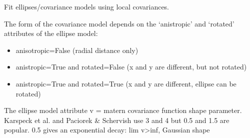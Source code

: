 \documentclass[letterpaper,10pt,english]{sphinxmanual}
\begin{document}
\begin{fulllineitems}
\begin{fulllineitems}
\label{\detokenize{ellipse:glomar_gridding.ellipse.EllipseBuilder.fit_ellipse_model}}
\pysigstartsignatures
\pysiglinewithargsret
{}
{\sphinxparamcomma {}\sphinxparamcomma {}\sphinxparamcomma {}\sphinxparamcomma {}\sphinxparamcomma {}\sphinxparamcomma {}\sphinxparamcomma {}\sphinxparamcomma {}\sphinxparamcomma {}\sphinxparamcomma {}\sphinxparamcomma {}\sphinxparamcomma {}\sphinxparamcomma {}}
{}
\pysigstopsignatures
\sphinxAtStartPar
Fit ellipses/covariance models using local covariances.

\sphinxAtStartPar
The form of the covariance model depends on the ‘anistropic’ and
‘rotated’ attributes of the ellipse model:
\begin{itemize}
\item {}
\sphinxAtStartPar
anisotropic=False (radial distance only)

\item {}
\sphinxAtStartPar
anistropic=True and rotated=False (x and y are different, but not
rotated)

\item {}
\sphinxAtStartPar
anistropic=True and rotated=True (x and y are different, ellipse can
be rotated)

\end{itemize}

\sphinxAtStartPar
The ellipse model attribute v = matern covariance function shape
parameter.
Karspeck et al.  and Paciorek \& Schervish
use 3 and 4 but 0.5 and 1.5 are popular. 0.5 gives an exponential decay:
lim v\textendash{}\textgreater{}inf, Gaussian shape


\end{fulllineitems}
\end{fulllineitems}
\end{document}
